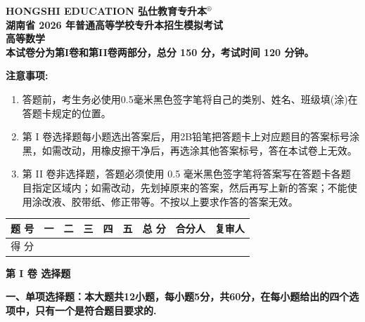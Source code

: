 \documentclass[12pt, a4paper]{article}
\begin{document}
\begin{center}
    \textbf{\Large HONGSHI EDUCATION 弘仕教育专升本$^{\circledR}$} \\[1em]
    
    \LARGE \textbf{湖南省 2026 年普通高等学校专升本招生模拟考试} \\[1em]
    \Huge \textbf{高等数学} \\[1em]
    \small \textbf{本试卷分为第I卷和第II卷两部分，总分 150 分，考试时间 120 分钟。}
\end{center}

\vspace{0.5em}

\noindent \textbf{注意事项:}
\begin{enumerate}[label=\arabic*., leftmargin=*, itemsep=0pt]
    \item 答题前，考生务必使用0.5毫米黑色签字笔将自己的类别、姓名、班级填(涂)在答题卡规定的位置。
    \item 第 I 卷选择题每小题选出答案后，用2B铅笔把答题卡上对应题目的答案标号涂黑，如需改动，用橡皮擦干净后，再选涂其他答案标号，答在本试卷上无效。
    \item 第 II 卷非选择题，答题必须使用 0.5 毫米黑色签字笔将答案写在答题卡各题目指定区域内；如需改动，先划掉原来的答案，然后再写上新的答案；不能使用涂改液、胶带纸、修正带等。不按以上要求作答的答案无效。
\end{enumerate}

\vspace{1em}

\begin{center}
    \begin{tabular}{|c|c|c|c|c|c|c|c|c|}
        \hline
        \rule{0pt}{15pt} 题 号 & 一 & 二 & 三 & 四 & 五 & 总 分 & 合分人 & 复审人 \\
        \hline
        \rule{0pt}{25pt} 得 分 & & & & & & & & \\
        \hline
    \end{tabular}
\end{center}

\vspace{2em}

\begin{center}
    \Large \textbf{第 I 卷 \quad 选择题}
\end{center}

\noindent \textbf{一、单项选择题：本大题共12小题，每小题5分，共60分，在每小题给出的四个选项中，只有一个是符合题目要求的.}
\end{document}

